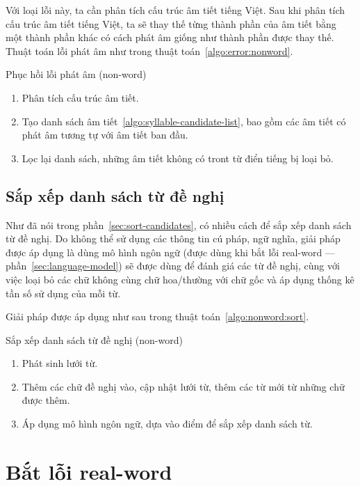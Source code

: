 \documentclass[a4paper,oneside,14pt]{extbook} %
\begin{document}
Với loại lỗi này, ta cần phân tích cấu trúc âm tiết tiếng Việt. Sau
khi phân tích cấu trúc âm tiết tiếng Việt, ta sẽ thay thế từng thành
phần của âm tiết bằng một thành phần khác có cách phát âm giống như
thành phần được thay thế. Thuật toán lỗi phát âm như trong thuật
toán~\ref{algo:error:nonword}.
\begin{algo}
\caption{Phục hồi lỗi phát âm (non-word)}
\label{algo:error:nonword}
  \begin{enumerate}
  \item Phân tích cấu trúc âm tiết.
  \item Tạo danh sách âm tiết~\ref{algo:syllable-candidate-list}, bao
    gồm các âm tiết có phát âm tương tự với âm tiết ban đầu.
  \item Lọc lại danh sách, những âm tiết không có tront từ điển tiếng
    bị loại bỏ.
  \end{enumerate}
\end{algo}

\subsection{Sắp xếp danh sách từ đề nghị}
\label{sec:nonword:sort-candidates}

Như đã nói trong phần~\ref{sec:sort-candidates}, có nhiều cách để sắp
xếp danh sách từ đề nghị. Do không thể sử dụng các thông tin cú pháp,
ngữ nghĩa, giải pháp được áp dụng là dùng mô hình ngôn ngữ (được dùng
khi bắt lỗi real-word --- phần~\ref{sec:language-model}) sẽ được dùng
để đánh giá các từ đề nghị, cùng với việc loại bỏ các chữ không cùng
chữ hoa/thường với chữ gốc và áp dụng thống kê tần số sử dụng của mỗi
từ.

Giải pháp được áp dụng như sau trong thuật
toán~\ref{algo:nonword:sort}.
\begin{algo}
\caption{Sắp xếp danh sách từ đề nghị (non-word)}
\label{algo:nonword:sort}
  \begin{enumerate}
  \item Phát sinh lưới từ.
  \item Thêm các chữ đề nghị vào, cập nhật lưới từ, thêm các từ mới từ
    những chữ được thêm. 
  \item Áp dụng mô hình ngôn ngữ, dựa vào điểm để sắp xếp danh sách từ.
  \end{enumerate}
\end{algo}

\section{Bắt lỗi real-word}
\end{document}
